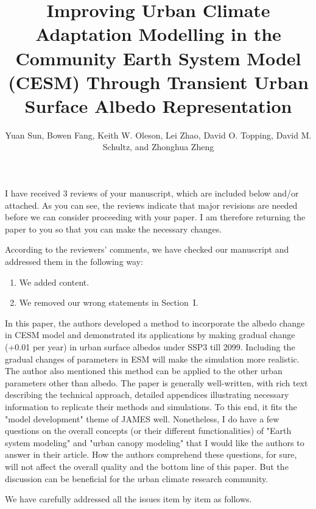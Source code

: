 \documentclass[12pt,american]{scrartcl}
\title{Improving Urban Climate Adaptation Modelling in the Community Earth System Model (CESM) Through Transient Urban Surface Albedo Representation}
\author{Yuan Sun, Bowen Fang, Keith W. Oleson, Lei Zhao, David O. Topping, David M. Schultz, and Zhonghua Zheng}
\begin{document}
\maketitle



\clearpage
\tableofcontents

\editor
\begin{generalcomment}
	I have received 3 reviews of your manuscript, which are included below and/or attached. As you can see, the reviews indicate that major revisions are needed before we can consider proceeding with your paper. I am therefore returning the paper to you so that you can make the necessary changes.
\end{generalcomment}
\begin{revresponse}
	According to the reviewers' comments, we have checked our manuscript and addressed them in the following way:
	\begin{enumerate}
		\item We added content.
		\item We removed our wrong statements in Section~I.
	\end{enumerate}
\end{revresponse}

\reviewer
\begin{generalcomment}
	In this paper, the authors developed a method to incorporate the albedo change in CESM model and demonstrated its applications by making gradual change (+0.01 per year) in urban surface albedos under SSP3 till 2099. Including the gradual changes of parameters in ESM will make the simulation more realistic. The author also mentioned this method can be applied to the other urban parameters other than albedo. The paper is generally well-written, with rich text describing the technical approach, detailed appendices illustrating necessary information to replicate their methods and simulations. To this end, it fits the "model development" theme of JAMES well. Nonetheless, I do have a few questions on the overall concepts (or their different functionalities) of "Earth system modeling" and "urban canopy modeling" that I would like the authors to answer in their article. How the authors comprehend these questions, for sure, will not affect the overall quality and the bottom line of this paper. But the discussion can be beneficial for the urban climate research community.
\end{generalcomment}
\begin{revresponse}
	We have carefully addressed all the issues item by item as follows.
\end{revresponse}
\end{document}
